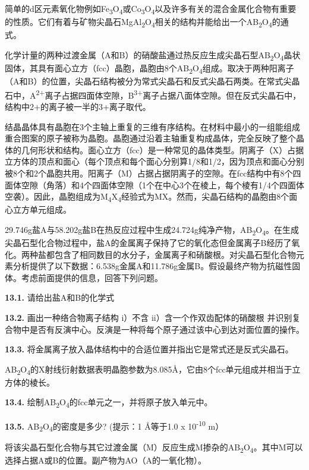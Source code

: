简单的d区元素氧化物例如Fe\textsubscript{3}O\textsubscript{4}或Co\textsubscript{3}O\textsubscript{4}以及许多有关的混合金属化合物有重要的性质。它们有着与矿物尖晶石MgAl\textsubscript{2}O\textsubscript{4}相关的结构并能给出一个AB\textsubscript{2}O\textsubscript{4}的通式。

化学计量的两种过渡金属（A和B）的硝酸盐通过热反应生成尖晶石型AB\textsubscript{2}O\textsubscript{4}晶状固体，其具有面心立方（fcc）晶胞，晶胞由8个AB\textsubscript{2}O\textsubscript{4}组成。取决于两种阳离子（A和B）的位置，尖晶石结构被分为常式尖晶石和反式尖晶石两类。在常式尖晶石中，A\textsuperscript{2+}离子占据四面体空隙，B\textsuperscript{3+}离子占据八面体空隙。但在反式尖晶石中，结构中2+的离子被一半的3+离子取代。

结晶晶体具有晶胞在3个主轴上重复的三维有序结构。在材料中最小的一组能组成重合图案的原子被称为晶胞。晶胞通过沿着主轴重复构成晶体，完全反映了整个晶体的几何形状和结构。面心立方（fcc）是一种常见的晶体类型。阴离子（X）占据立方体的顶点和面心（每个顶点和每个面心分别算1/8和1/2，因为顶点和面心分别被8个和2个晶胞共用。阳离子（M）占据占据阴离子的空隙。在fcc结构中有8个四面体空隙（角落）和4个四面体空隙（1个在中心3个在棱上，每个棱有1/4个四面体空袭）。因此，晶胞组成为M\textsubscript{4}X\textsubscript{4}经验式为MX。然而，尖晶石结构的晶胞由8个面心立方单元组成。

29.746g盐A与58.202g盐B在热反应过程中生成24.724g纯净产物，AB\textsubscript{2}O\textsubscript{4}。在生成尖晶石型化合物过程中，盐A的金属离子保持了它的氧化态但金属离子B经历了氧化。两种盐都包含了相同数目的水分子，金属离子和硝酸根。对尖晶石型化合物元素分析提供了以下数据：6.538g金属A和11.786g金属B。假设最终产物为抗磁性固体。考虑前面提供的信息，回答下列问题。

\textbf{13.1.} 请给出盐A和B的化学式

\textbf{13.2.} 画出一种络合物离子结构 i）不含
ii）含一个作双齿配体的硝酸根
并识别复合物中是否有反演中心。反演是一种将每个原子通过该中心到达对面位置的操作。

\textbf{13.3.}
将金属离子放入晶体结构中的合适位置并指出它是常式还是反式尖晶石。

AB\textsubscript{2}O\textsubscript{4}的X射线衍射数据表明晶胞参数为8.085Å，它由8个fcc单元组成并相当于立方体的棱长。

\textbf{13.4.}
绘制AB\textsubscript{2}O\textsubscript{4}的fcc单元之一，并将原子放入单元中。

\textbf{13.5.} AB\textsubscript{2}O\textsubscript{4}的密度是多少?
(提示：1 Å等于1.0 x 10\textsuperscript{-10} m）

将该尖晶石型化合物与其它过渡金属（M）反应生成M掺杂的AB\textsubscript{2}O\textsubscript{4}。其中M可以选择占据A或B的位置。副产物为AO（A的一氧化物）。

